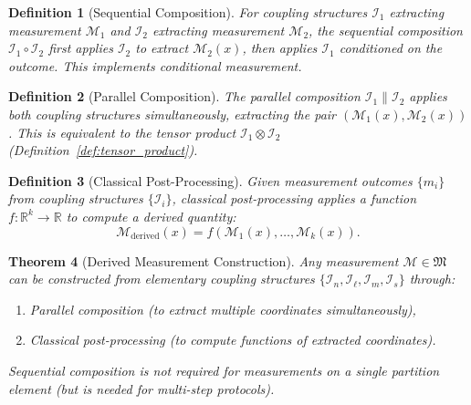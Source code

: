 \documentclass[twocolumn,10pt,a4paper]{article}
\newtheorem{theorem}{Theorem}[section]
\newtheorem{definition}[theorem]{Definition}
\theoremstyle{remark}
\newcommand{\Reals}{\mathbb{R}}
\begin{document}
\begin{definition}[Sequential Composition]
\label{def:sequential_composition}
For coupling structures $\mathcal{I}_1$ extracting measurement $\mathcal{M}_1$ and $\mathcal{I}_2$ extracting measurement $\mathcal{M}_2$, the \emph{sequential composition} $\mathcal{I}_1 \circ \mathcal{I}_2$ first applies $\mathcal{I}_2$ to extract $\mathcal{M}_2(x)$, then applies $\mathcal{I}_1$ conditioned on the outcome. This implements conditional measurement.
\end{definition}

\begin{definition}[Parallel Composition]
\label{def:parallel_composition}
The \emph{parallel composition} $\mathcal{I}_1 \parallel \mathcal{I}_2$ applies both coupling structures simultaneously, extracting the pair $(\mathcal{M}_1(x), \mathcal{M}_2(x))$. This is equivalent to the tensor product $\mathcal{I}_1 \otimes \mathcal{I}_2$ (Definition~\ref{def:tensor_product}).
\end{definition}

\begin{definition}[Classical Post-Processing]
\label{def:post_processing}
Given measurement outcomes $\{m_i\}$ from coupling structures $\{\mathcal{I}_i\}$, \emph{classical post-processing} applies a function $f: \Reals^k \to \Reals$ to compute a derived quantity:
\begin{equation}
\mathcal{M}_{\text{derived}}(x) = f(\mathcal{M}_1(x), \ldots, \mathcal{M}_k(x)).
\end{equation}
\end{definition}

\begin{theorem}[Derived Measurement Construction]
\label{thm:derived_construction}
Any measurement $\mathcal{M} \in \mathfrak{M}$ can be constructed from elementary coupling structures $\{\mathcal{I}_n, \mathcal{I}_\ell, \mathcal{I}_m, \mathcal{I}_s\}$ through:
\begin{enumerate}[label=(\roman*), noitemsep]
    \item Parallel composition (to extract multiple coordinates simultaneously),
    \item Classical post-processing (to compute functions of extracted coordinates).
\end{enumerate}
Sequential composition is not required for measurements on a single partition element (but is needed for multi-step protocols).
\end{theorem}
\end{document}
